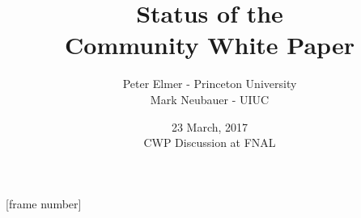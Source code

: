 \documentclass{beamer}
\title{Status of the\\
     Community White Paper}
\author{Peter Elmer - Princeton University \\
        Mark Neubauer - UIUC}
\date{23 March, 2017 \\ CWP Discussion at FNAL}
\begin{document}
\maketitle

%
%

[frame number]

















%
%





%
%
%

%
%

%
%
%
%

%
%

%

%
%
%

%
%

%
%

%
%
%

%

%

%

%

%
%
\end{document}
